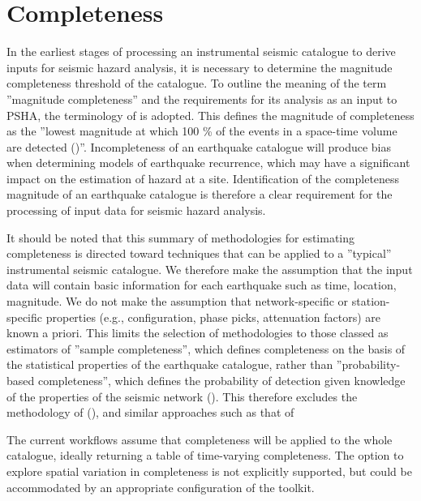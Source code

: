 
\section{Completeness}

In the earliest stages of processing an instrumental seismic catalogue to derive inputs for seismic hazard analysis, it is necessary to determine the magnitude completeness threshold of the catalogue. To outline the meaning of the term ''magnitude completeness'' and the requirements for its analysis as an input to PSHA, the terminology of \cite{MignanWoessner2012} is adopted. This defines the magnitude of completeness as the ''lowest magnitude at which 100 \% of the events in a space-time volume are detected (\cite{RydelekSacks1989, WoessnerWiemer2005})''. Incompleteness of an earthquake catalogue will produce bias when determining models of earthquake recurrence, which may have a significant impact on the estimation of hazard at a site. Identification of the completeness magnitude of an earthquake catalogue is therefore a clear requirement for the processing of input data for seismic hazard analysis.

It should be noted that this summary of methodologies for estimating completeness is directed toward techniques that can be applied to a ''typical'' instrumental seismic catalogue. We therefore make the assumption that the input data will contain basic information for each earthquake such as time, location, magnitude. We do not make the assumption that network-specific or station-specific properties (e.g., configuration, phase picks, attenuation factors) are known a priori. This limits the selection of methodologies to those classed as estimators of ''sample completeness'', which defines completeness on the basis of the statistical properties of the earthquake catalogue, rather than ''probability-based completeness'', which defines the probability of detection given knowledge of the properties of the seismic network (\cite{SchorlemmerWoessner2008}). This therefore excludes the methodology of (\cite{SchorlemmerWoessner2008}), and similar approaches such as that of \cite{Felzer2008}

The current workflows assume that completeness will be applied to the whole catalogue, ideally returning a table of time-varying completeness. The option to explore spatial variation in completeness is not explicitly supported, but could be accommodated by an appropriate configuration of the toolkit.

